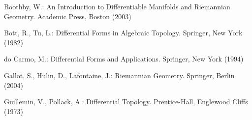 \RGReferenceSection

\begin{description}[style=multiline,leftmargin=5em,labelwidth=4.5em,font=\normalfont]
\item[{[Boo03]}]Boothby, W.: An Introduction to Differentiable Manifolds and Riemannian Geometry. Academic Press, Boston (2003)
\item[{[BT82]}]Bott, R., Tu, L.: Differential Forms in Algebraic Topology. Springer, New York (1982)
\item[{[dC94]}]do Carmo, M.: Differential Forms and Applications. Springer, New York (1994)
\item[{[GHL04]}]Gallot, S., Hulin, D., Lafontaine, J.: Riemannian Geometry. Springer, Berlin (2004)
\item[{[GP73]}]Guillemin, V., Pollack, A.: Differential Topology. Prentice-Hall, Englewood Cliffs (1973)
\end{description}
